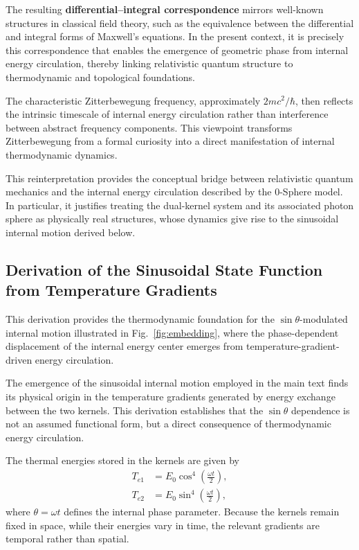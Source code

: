 \documentclass[%
 reprint,
 amsmath,amssymb,
 aps,
 prb,
]{revtex4-2}
\numberwithin{equation}{section}
\begin{document}
The resulting \textbf{differential--integral correspondence} mirrors well-known structures in classical field theory, such as the equivalence between the differential and integral forms of Maxwell's equations.
In the present context, it is precisely this correspondence that enables the emergence of geometric phase from internal energy circulation, thereby linking relativistic quantum structure to thermodynamic and topological foundations.

The characteristic Zitterbewegung frequency, approximately $2mc^2/\hbar$, then reflects the intrinsic timescale of internal energy circulation rather than interference between abstract frequency components. This viewpoint transforms Zitterbewegung from a formal curiosity into a direct manifestation of internal thermodynamic dynamics.

This reinterpretation provides the conceptual bridge between relativistic quantum mechanics and the internal energy circulation described by the 0-Sphere model. In particular, it justifies treating the dual-kernel system and its associated photon sphere as physically real structures, whose dynamics give rise to the sinusoidal internal motion derived below.


\subsection{Derivation of the Sinusoidal State Function from Temperature Gradients}
\label{subsec:sinusoidal_derivation}

This derivation provides the thermodynamic foundation for the $\sin\theta$-modulated internal motion illustrated in Fig.~\ref{fig:embedding}, where the phase-dependent displacement of the internal energy center emerges from temperature-gradient-driven energy circulation.

The emergence of the sinusoidal internal motion employed in the main text finds its physical origin in the temperature gradients generated by energy exchange between the two kernels. This derivation establishes that the $\sin\theta$ dependence is not an assumed functional form, but a direct consequence of thermodynamic energy circulation.

The thermal energies stored in the kernels are given by
\begin{align}
T_{e1} &= E_0 \cos^4\!\left(\frac{\omega t}{2}\right), \label{eq:kernel_A_energy}\\
T_{e2} &= E_0 \sin^4\!\left(\frac{\omega t}{2}\right), \label{eq:kernel_B_energy}
\end{align}
where $\theta = \omega t$ defines the internal phase parameter. Because the kernels remain fixed in space, while their energies vary in time, the relevant gradients are temporal rather than spatial.
\end{document}
